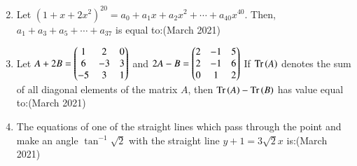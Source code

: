 \documentclass[journal,12pt,onecolumn]{IEEEtran}
\theoremstyle{remark}
\begin{document}
\begin{enumerate}
\begin{multicols}{2}
\end{multicols}


\item Let $(1 + x + 2x^2)^{20} = a_0 + a_1x + a_2x^2 + \cdots + a_{40}x^{40}$. Then, $a_1 + a_3 + a_5 + \cdots + a_{37}$ is equal to:\hfill (March 2021)

\begin{enumerate}
    
\end{enumerate}
   

\item Let $
A + 2B = \begin{pmatrix}1 & 2 & 0 \\
6 & -3 & 3 \\
-5 & 3 & 1 \end{pmatrix}$
 and 
  $2A - B = \begin{pmatrix}2 & -1 & 5 \\
2 & -1 & 6 \\
0 & 1 & 2\end{pmatrix}
$ If $\text{Tr}\left(A\right)$ denotes the sum of all diagonal elements of the matrix $A$, then $\text{Tr}\left(A\right) - \text{Tr}\left(B\right)$ has value equal to:\hfill (March 2021)

\begin{enumerate}
  
\end{enumerate}
\item The equations of one of the straight lines which pass through the point  and make an angle $\tan^{-1} \sqrt{2}$ with the straight line $y + 1 = 3\sqrt{2}x$ is:\hfill (March 2021)

\begin{enumerate}
    

\end{enumerate}
\end{enumerate}
\end{document}
